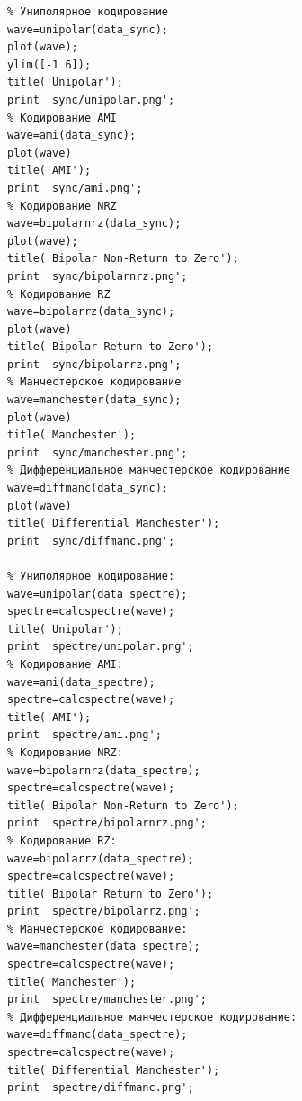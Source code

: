 \begin{enumerate}
\begin{itemize}
\begin{verbatim}
% Униполярное кодирование
wave=unipolar(data_sync);
plot(wave);
ylim([-1 6]);
title('Unipolar');
print 'sync/unipolar.png';
% Кодирование AMI
wave=ami(data_sync);
plot(wave)
title('AMI');
print 'sync/ami.png';
% Кодирование NRZ
wave=bipolarnrz(data_sync);
plot(wave);
title('Bipolar Non-Return to Zero');
print 'sync/bipolarnrz.png';
% Кодирование RZ
wave=bipolarrz(data_sync);
plot(wave)
title('Bipolar Return to Zero');
print 'sync/bipolarrz.png';
% Манчестерское кодирование
wave=manchester(data_sync);
plot(wave)
title('Manchester');
print 'sync/manchester.png';
% Дифференциальное манчестерское кодирование
wave=diffmanc(data_sync);
plot(wave)
title('Differential Manchester');
print 'sync/diffmanc.png';

% Униполярное кодирование:
wave=unipolar(data_spectre);
spectre=calcspectre(wave);
title('Unipolar');
print 'spectre/unipolar.png';
% Кодирование AMI:
wave=ami(data_spectre);
spectre=calcspectre(wave);
title('AMI');
print 'spectre/ami.png';
% Кодирование NRZ:
wave=bipolarnrz(data_spectre);
spectre=calcspectre(wave);
title('Bipolar Non-Return to Zero');
print 'spectre/bipolarnrz.png';
% Кодирование RZ:
wave=bipolarrz(data_spectre);
spectre=calcspectre(wave);
title('Bipolar Return to Zero');
print 'spectre/bipolarrz.png';
% Манчестерское кодирование:
wave=manchester(data_spectre);
spectre=calcspectre(wave);
title('Manchester');
print 'spectre/manchester.png';
% Дифференциальное манчестерское кодирование:
wave=diffmanc(data_spectre);
spectre=calcspectre(wave);
title('Differential Manchester');
print 'spectre/diffmanc.png';
            \end{verbatim}
        \end{itemize}


\end{enumerate}

